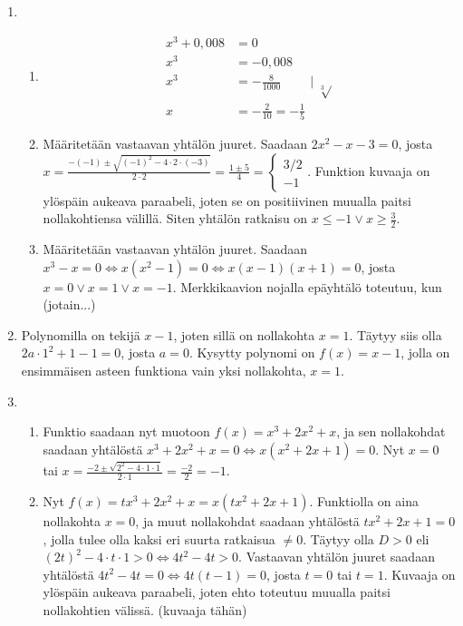 \documentclass[12pt,fleqn]{article}
\begin{document}
\begin{enumerate}[label=\textbf{\arabic*.}]
\item
\begin{enumerate}[label=\textbf{\alph*)}]
\item 
\begin{align}
\displaystyle
x^3+0,008&=0 \\
x^3&=-0,008 \\
x^3&= -\frac{8}{1000} \qquad \mid \sqrt[3]{ } \\
x&=-\frac{2}{10}=-\frac{1}{5}

\end{align}

\item Määritetään vastaavan yhtälön juuret. Saadaan \(2x^2-x-3=0\), josta \(\displaystyle x=\frac{-(-1)\pm \sqrt{(-1)^2-4\cdot 2\cdot (-3)}}{2\cdot 2}=\frac{1\pm 5}{4}=\begin{cases} 3/2 \\ -1 \end{cases}\). Funktion kuvaaja on ylöspäin aukeava paraabeli, joten se on positiivinen muualla paitsi nollakohtiensa välillä. Siten yhtälön ratkaisu on \(x\leq -1 \vee x\geq \frac{3}{2}\).

\item Määritetään vastaavan yhtälön juuret. Saadaan \(x^3-x=0\Leftrightarrow x(x^2-1)=0\Leftrightarrow x(x-1)(x+1)=0\), josta \(x=0 \vee x=1 \vee x=-1\). Merkkikaavion nojalla epäyhtälö toteutuu, kun (jotain...)
\end{enumerate}

\item Polynomilla on tekijä \(x-1\), joten sillä on nollakohta \(x=1\). Täytyy siis olla \(2a\cdot 1^2+1-1=0\), josta \(a=0\). Kysytty polynomi on \(f(x)=x-1\), jolla on ensimmäisen asteen funktiona vain yksi nollakohta, \(x=1\).

\item 
\begin{enumerate}[label=\textbf{\alph*)}]
\item Funktio saadaan nyt muotoon \(f(x)=x^3+2x^2+x\), ja sen nollakohdat saadaan yhtälöstä \(x^3+2x^2+x=0\Leftrightarrow x(x^2+2x+1)=0\). Nyt \(x=0\) tai \(\displaystyle x=\frac{-2\pm \sqrt{2^2-4\cdot 1\cdot 1}}{2\cdot 1}=\frac{-2}{2}=-1\).

\item Nyt \(f(x)=tx^3+2x^2+x=x(tx^2+2x+1)\). Funktiolla on aina nollakohta \(x=0\), ja muut nollakohdat saadaan yhtälöstä \(tx^2+2x+1=0\), jolla tulee olla kaksi eri suurta ratkaisua \(\neq 0\). Täytyy olla \(D>0\) eli \((2t)^2-4\cdot t\cdot 1>0\Leftrightarrow 4t^2-4t>0\). Vastaavan yhtälön juuret saadaan yhtälöstä \(4t^2-4t=0\Leftrightarrow 4t(t-1)=0\), josta \(t=0\) tai \(t=1\). Kuvaaja on ylöspäin aukeava paraabeli, joten ehto toteutuu muualla paitsi nollakohtien välissä. (kuvaaja tähän)
\end{enumerate}


\end{enumerate}
\end{document}

